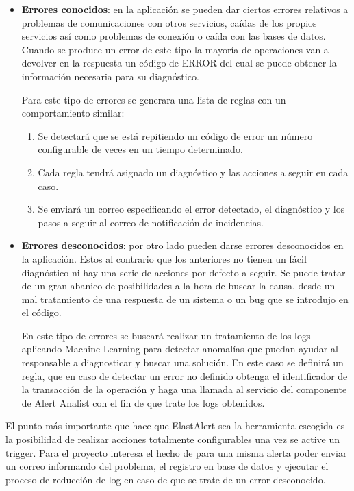 \begin{itemize}
    \item \textbf{Errores conocidos}: en la aplicación se pueden dar ciertos errores relativos a problemas de comunicaciones con otros servicios, caídas de los propios servicios así como problemas de conexión o caída con las bases de datos. Cuando se produce un error de este tipo la mayoría de operaciones van a devolver en la respuesta un código de ERROR del cual se puede obtener la información necesaria para su diagnóstico.
    
    Para este tipo de errores se generara una lista de reglas con un comportamiento similar:
    \begin{enumerate}
        \item Se detectará que se está repitiendo un código de error un número configurable de veces en un tiempo determinado.
        \item Cada regla tendrá asignado un diagnóstico y las acciones a seguir en cada caso.
        \item Se enviará un correo especificando el error detectado, el diagnóstico y los pasos a seguir al correo de notificación de incidencias.
        
    \end{enumerate}
    
    \item \textbf{Errores desconocidos}: por otro lado pueden darse errores desconocidos en la aplicación. Estos al contrario que los anteriores no tienen un fácil diagnóstico ni hay una serie de acciones por defecto a seguir. Se puede tratar de un gran abanico de posibilidades a la hora de buscar la causa, desde un mal tratamiento de una respuesta de un sistema o un bug que se introdujo en el código. 
    
    En este tipo de errores se buscará realizar un tratamiento de los logs aplicando Machine Learning para detectar anomalías que puedan ayudar al responsable a diagnosticar y buscar una solución. En este caso se definirá un regla, que en caso de detectar un error no definido obtenga el identificador de la transacción de la operación y haga una llamada al servicio del componente de Alert Analist con el fin de que trate los logs obtenidos.
    
\end{itemize}

El punto más importante que hace que ElastAlert sea la herramienta escogida es la posibilidad de realizar acciones totalmente configurables una vez se active un trigger. Para el proyecto interesa el hecho de para una misma alerta poder enviar un correo informando del problema, el registro en base de datos y ejecutar el proceso de reducción de log en caso de que se trate de un error desconocido.



